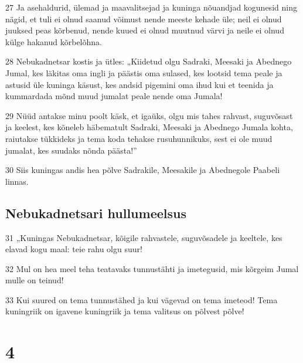 \par 27 Ja asehaldurid, ülemad ja maavalitsejad ja kuninga nõuandjad kogunesid ning nägid, et tuli ei olnud saanud võimust nende meeste kehade üle; neil ei olnud juuksed peas kõrbenud, nende kuued ei olnud muutnud värvi ja neile ei olnud külge hakanud kõrbelõhna.
\par 28 Nebukadnetsar kostis ja ütles: „Kiidetud olgu Sadraki, Meesaki ja Abednego Jumal, kes läkitas oma ingli ja päästis oma sulased, kes lootsid tema peale ja astusid üle kuninga käsust, kes andsid pigemini oma ihud kui et teenida ja kummardada mõnd muud jumalat peale nende oma Jumala!
\par 29 Nüüd antakse minu poolt käsk, et igaüks, olgu mis tahes rahvast, suguvõsast ja keelest, kes kõneleb häbematult Sadraki, Meesaki ja Abednego Jumala kohta, raiutakse tükkideks ja tema koda tehakse rusuhunnikuks, sest ei ole muud jumalat, kes suudaks nõnda päästa!”
\par 30 Siis kuningas andis hea põlve Sadrakile, Meesakile ja Abednegole Paabeli linnas.
\section*{Nebukadnetsari hullumeelsus}

\par 31 „Kuningas Nebukadnetsar, kõigile rahvastele, suguvõsadele ja keeltele, kes elavad kogu maal: teie rahu olgu suur!
\par 32 Mul on hea meel teha teatavaks tunnustähti ja imetegusid, mis kõrgeim Jumal mulle on teinud!
\par 33 Kui suured on tema tunnustähed ja kui vägevad on tema imeteod! Tema kuningriik on igavene kuningriik ja tema valitsus on põlvest põlve!

\chapter{4}

